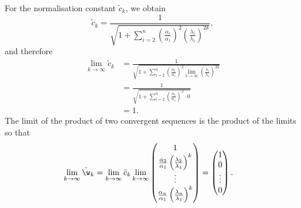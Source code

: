 \begin{exenumerate}
\begin{solution}
    For the normalisation constant $\tilde{c}_k$, we obtain
    \begin{equation}
      \tilde{c}_k = \frac{1}{\sqrt{1 + \sum_{i=2}^n \left(\frac{\alpha_i}{\alpha_1}\right)^2 \left(\frac{\lambda_i}{\lambda_1}\right)^{2k}}},
    \end{equation}
    and therefore
    \begin{align}
      \lim_{k \rightarrow \infty} \tilde{c}_k &= \frac{1}{\sqrt{1 + \sum_{i=2}^n \left(\frac{\alpha_i}{\alpha_1}\right)^2 \underset{k \rightarrow \infty}
                                                {\lim}\left(\frac{\lambda_i}{\lambda_1}\right)^{2k}}} \\
                                              &= \frac{1}{\sqrt{1 + \sum_{i=2}^n \left(\frac{\alpha_i}{\alpha_1}\right)^2 \cdot 0}} \\
                                              &= 1.
    \end{align}
    The limit of the product of two convergent sequences is the product of the limits so that 
    \begin{align}
      \lim_{k \rightarrow \infty} \tilde{\w}_k &= \lim_{k \rightarrow \infty} \tilde{c}_k 
                                                 \lim_{k \rightarrow \infty} \begin{pmatrix}
                                                                               1 \\
                                                                               \frac{\alpha_2}{\alpha_1}\left(\frac{\lambda_2}{\lambda_1}\right)^k \\
                                                                               \vdots \\
                                                                               \frac{\alpha_n}{\alpha_1}\left(\frac{\lambda_n}{\lambda_1}\right)^k \\
                                                                             \end{pmatrix}
                                                 = 
                                                 \begin{pmatrix} 
                                                   1 \\ 
                                                   0 \\ 
                                                   \vdots \\ 
                                                   0 
                                                 \end{pmatrix}.
    \end{align}
    

\end{solution}
\end{exenumerate}
